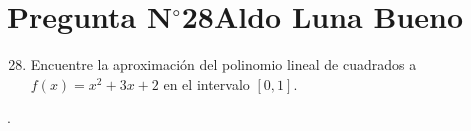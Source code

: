 \section{Pregunta N$^{\circ}$28\qquad Aldo Luna Bueno}

\begin{frame}
	\begin{enumerate}\setcounter{enumi}{27}
		\item

		      Encuentre la aproximación del polinomio lineal de cuadrados
		      a
		      \begin{math}
			      f\left(x\right)=
			      x^{2}+3x+2
		      \end{math}
		      en el intervalo $\left[0,1\right]$.
	\end{enumerate}

	\begin{solution}
		.
	\end{solution}
\end{frame}